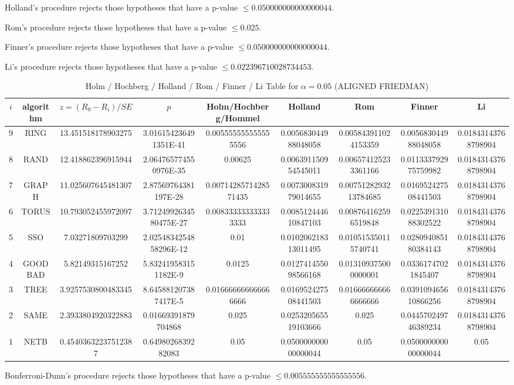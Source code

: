\documentclass[a4paper,10pt]{article}
\begin{document}
\begin{landscape}
Holland's procedure rejects those hypotheses that have a p-value $\le0.050000000000000044$.


Rom's procedure rejects those hypotheses that have a p-value $\le0.025$.


Finner's procedure rejects those hypotheses that have a p-value $\le0.050000000000000044$.


Li's procedure rejects those hypotheses that have a p-value $\le0.022396710028734453$.



\newpage

\begin{table}[!htp]
\centering\scriptsize
\caption{Holm / Hochberg / Holland / Rom / Finner / Li Table for $\alpha=0.05$ (ALIGNED FRIEDMAN)}
\begin{tabular}{ccccccccc}
$i$&algorithm&$z=(R_0 - R_i)/SE$&$p$&Holm/Hochberg/Hommel&Holland&Rom&Finner&Li\\
\hline
9& RING&13.451518178903275&3.016154236491351E-41&0.005555555555555556&0.005683044988048058&0.005843911024153359&0.005683044988048058&0.01843143768798904\\
8& RAND&12.418862396915944&2.064765774550976E-35&0.00625&0.006391150954545011&0.006574125233361166&0.011333792975759982&0.01843143768798904\\
7& GRAPH&11.025607645481307&2.87569764381197E-28&0.0071428571428571435&0.007300831979014655&0.0075128293213784685&0.016952427508441503&0.01843143768798904\\
6& TORUS&10.793052455972097&3.7124992634580475E-27&0.008333333333333333&0.008512444610847103&0.008764162596519848&0.022539131088302522&0.01843143768798904\\
5& SSO&7.03271809703299&2.0254834254858296E-12&0.01&0.010206218313011495&0.010515350115740741&0.028094085180384143&0.01843143768798904\\
4& GOODBAD&5.82149315167252&5.832419583151182E-9&0.0125&0.012741455098566168&0.013109375000000001&0.03361747021845407&0.01843143768798904\\
3& TREE&3.9257530800483345&8.645881207387417E-5&0.016666666666666666&0.016952427508441503&0.016666666666666666&0.039109465610866256&0.01843143768798904\\
2& SAME&2.3933804920322883&0.01669391879704868&0.025&0.025320565519103666&0.025&0.044570249746389234&0.01843143768798904\\
1& NETB&0.45403632237512387&0.6498026839282083&0.05&0.050000000000000044&0.05&0.050000000000000044&0.05\\
\hline
\end{tabular}
\end{table}
Bonferroni-Dunn's procedure rejects those hypotheses that have a p-value $\le0.005555555555555556$.



\end{landscape}
\end{document}
